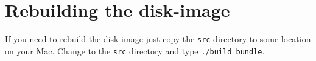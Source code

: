 \documentclass[a4paper]{amsart}
\begin{document}
\section*{Rebuilding the disk-image}

If you need to rebuild the disk-image just copy the \texttt{src} directory to some location on your Mac. Change to the \texttt{src} directory and type \texttt{./build\_bundle}.
\end{document}
